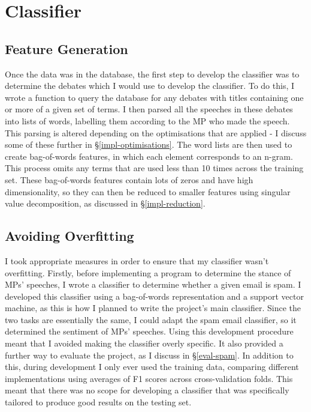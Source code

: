 \documentclass[12pt,a4paper,twoside,openright]{report}
\begin{document}
\section{Classifier} \label{impl-classifier}

\subsection{Feature Generation}

Once the data was in the database, the first step to develop the classifier was to determine the debates which I would use to develop the classifier. To do this, I wrote a function to query the database for any debates with titles containing one or more of a given set of terms. I then parsed all the speeches in these debates into lists of words, labelling them according to the MP who made the speech. This parsing is altered depending on the optimisations that are applied - I discuss some of these further in \S\ref{impl-optimisations}. The word lists are then used to create bag-of-words features, in which each element corresponds to an n-gram. This process omits any terms that are used less than 10 times across the training set. These bag-of-words features contain lots of zeros and have high dimensionality, so they can then be reduced to smaller features using singular value decomposition, as discussed in \S\ref{impl-reduction}.

\subsection{Avoiding Overfitting} \label{impl-overfitting}

I took appropriate measures in order to ensure that my classifier wasn't overfitting. Firstly, before implementing a program to determine the stance of MPs' speeches, I wrote a classifier to determine whether a given email is spam. I developed this classifier using a bag-of-words representation and a support vector machine, as this is how I planned to write the project's main classifier. Since the two tasks are essentially the same, I could adapt the spam email classifier, so it determined the sentiment of MPs' speeches. Using this development procedure meant that I avoided making the classifier overly specific. It also provided a further way to evaluate the project, as I discuss in \S\ref{eval-spam}. In addition to this, during development I only ever used the training data, comparing different implementations using averages of F1 scores across cross-validation folds. This meant that there was no scope for developing a classifier that was specifically tailored to produce good results on the testing set.
\end{document}
